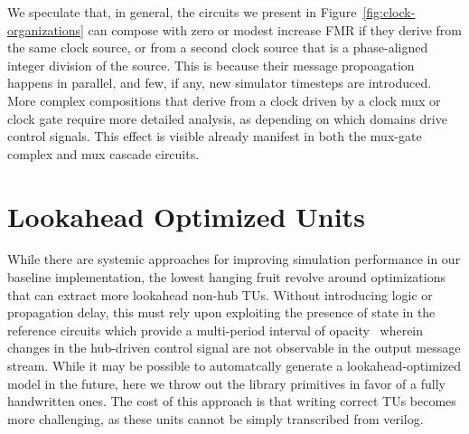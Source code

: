We speculate that, in general, the circuits we present in
Figure~\ref{fig:clock-organizations} can compose with zero or modest increase
FMR if they derive from the same clock source, or from a second clock source
that is a phase-aligned integer division of the source. This is because their
message propoagation happens in parallel, and few, if any, new simulator
timesteps are introduced. More complex compositions that derive from a clock
driven by a clock mux or clock gate require more detailed analysis, as
depending on which domains drive control signals. This effect is visible
already manifest in both the mux-gate complex and mux cascade circuits.

\section{Lookahead Optimized Units}\label{sec:pdes-opt-units}
While there are systemic approaches for improving simulation performance in our
baseline implementation, the lowest hanging fruit revolve around optimizations
that can extract more lookahead non-hub TUs. Without introducing logic or
propagation delay, this must rely upon exploiting the presence of state in the
reference circuits which provide a multi-period interval of
opacity~\cite{ImplicitLookahead2} wherein changes in the hub-driven control
signal are not observable in the output message stream. While it may be
possible to automatcally  generate a lookahead-optimized model in the future,
here we throw out the library primitives in favor of a fully handwritten ones.
The cost of this approach is that writing correct TUs becomes more challenging,
as these units cannot be simply transcribed from verilog.

